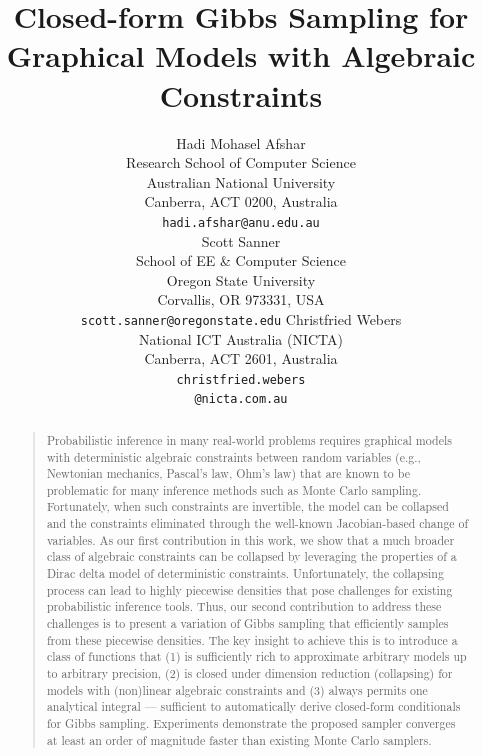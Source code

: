 \documentclass[letterpaper]{article}
\begin{document}
%
\title{Closed-form Gibbs Sampling for Graphical Models with Algebraic Constraints}
\author{Hadi Mohasel Afshar 
\\
Research School of Computer Science \\
Australian National University\\
Canberra, ACT 0200, Australia\\
\texttt{hadi.afshar@anu.edu.au} \\
\And
Scott Sanner\\
School of EE \& Computer Science\\
Oregon State University\\
Corvallis, OR 973331, USA\\
\texttt{scott.sanner@oregonstate.edu}
\And
Christfried Webers\\
National ICT Australia (NICTA)\\
Canberra, ACT 2601, Australia\\
\texttt{christfried.webers}\\
\texttt{@nicta.com.au}
}
\maketitle


%

\begin{abstract}
\begin{quote}
Probabilistic inference in many real-world problems requires graphical models with deterministic algebraic constraints between random variables (e.g., Newtonian mechanics, Pascal's law, Ohm's law) that are known to be problematic for many inference methods such as 
Monte Carlo sampling. Fortunately, when such constraints are invertible, the model can be collapsed and the constraints eliminated through the well-known Jacobian-based change of variables. As our first contribution in this work, we show that a much broader class of algebraic constraints can be collapsed by leveraging the properties of a Dirac delta model of deterministic constraints. Unfortunately, the collapsing process can lead to highly piecewise densities that pose challenges for existing probabilistic inference tools. Thus, our second contribution to address these challenges is to present a variation of Gibbs sampling that efficiently samples from these piecewise densities. The key insight to achieve this is to introduce a class of functions that 
(1) is sufficiently rich to approximate arbitrary models up to arbitrary precision, 
(2) is closed under dimension reduction (collapsing) for models with (non)linear algebraic constraints and 
(3) always permits one analytical integral — sufficient to automatically derive closed-form conditionals for Gibbs sampling.  Experiments demonstrate the proposed sampler converges at least an order of magnitude faster than existing Monte Carlo samplers.
\end{quote}
\end{abstract}
\end{document}
